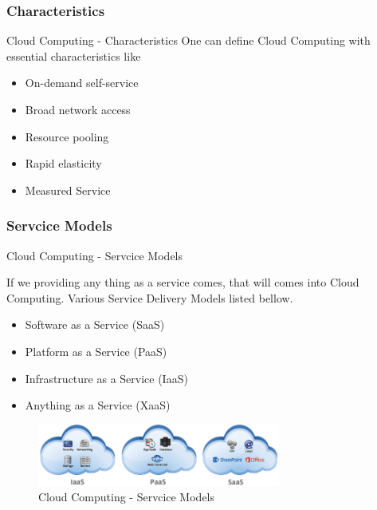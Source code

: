 \documentclass[10pt,xcolor=dvipsnames]{beamer}
\begin{document}
\subsubsection{Characteristics}
\begin{frame} {Cloud Computing - Characteristics }
One can define Cloud Computing with essential characteristics like

\begin{itemize}
\item On-demand self-service
\item Broad network access
\item Resource pooling
\item Rapid elasticity
\item Measured Service
\end{itemize}
\end{frame}
\subsubsection{Servcice Models}
\begin{frame}{Cloud Computing - Servcice Models }

If we providing any thing as a service comes, that will comes into Cloud Computing. Various Service Delivery Models listed bellow.

\begin{itemize}
\item Software as a Service (SaaS) 
\item Platform as a Service (PaaS)
\item Infrastructure as a Service (IaaS)
\item Anything as a Service (XaaS)
\end{itemize}
\begin{figure}[H]
 \centering
 \includegraphics[width=8cm]{./service.png}
 \caption{Cloud Computing - Servcice Models \label{fig:Cloud Computing - Servcice Models} }
\end{figure}

\end{frame}
\end{document}
